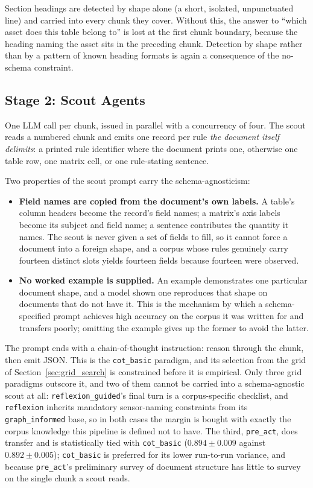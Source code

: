 \documentclass[11pt]{article}
\begin{document}
Section headings are detected by shape alone (a short, isolated, unpunctuated
line) and carried into every chunk they cover. Without this, the answer to
``which asset does this table belong to'' is lost at the first chunk boundary,
because the heading naming the asset sits in the preceding chunk. Detection by
shape rather than by a pattern of known heading formats is again a consequence of
the no-schema constraint.

\subsection{Stage 2: Scout Agents}
\label{sec:stage_scout}
One LLM call per chunk, issued in parallel with a concurrency of four. The scout
reads a numbered chunk and emits one record per rule \emph{the document itself
delimits}: a printed rule identifier where the document prints one, otherwise
one table row, one matrix cell, or one rule-stating sentence.

Two properties of the scout prompt carry the schema-agnosticism:

\begin{itemize}
    \item \textbf{Field names are copied from the document's own labels.} A
          table's column headers become the record's field names; a matrix's axis
          labels become its subject and field name; a sentence contributes the
          quantity it names. The scout is never given a set of fields to fill, so
          it cannot force a document into a foreign shape, and a corpus whose
          rules genuinely carry fourteen distinct slots yields fourteen fields
          because fourteen were observed.
    \item \textbf{No worked example is supplied.} An example demonstrates one
          particular document shape, and a model shown one reproduces that shape
          on documents that do not have it. This is the mechanism by which a
          schema-specified prompt achieves high accuracy on the corpus it was
          written for and transfers poorly; omitting the example gives up the
          former to avoid the latter.
\end{itemize}

The prompt ends with a chain-of-thought instruction: reason through the chunk,
then emit JSON. This is the \texttt{cot\_basic} paradigm, and its selection from
the grid of Section~\ref{sec:grid_search} is constrained before it is empirical.
Only three grid paradigms outscore it, and two of them cannot be carried into a
schema-agnostic scout at all: \texttt{reflexion\_guided}'s final turn is a
corpus-specific checklist, and \texttt{reflexion} inherits mandatory
sensor-naming constraints from its \texttt{graph\_informed} base, so in both
cases the margin is bought with exactly the corpus knowledge this pipeline is
defined not to have. The third, \texttt{pre\_act}, does transfer and is
statistically tied with \texttt{cot\_basic} ($0.894 \pm 0.009$ against
$0.892 \pm 0.005$); \texttt{cot\_basic} is preferred for its lower run-to-run
variance, and because \texttt{pre\_act}'s preliminary survey of document
structure has little to survey on the single chunk a scout reads.
\end{document}
